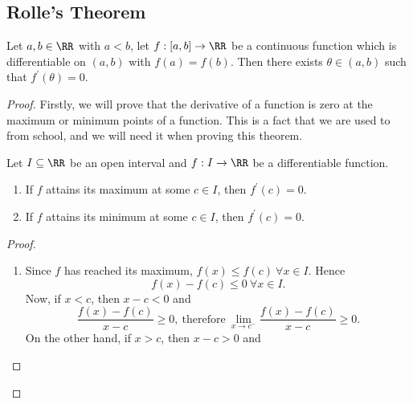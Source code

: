 \documentclass[../real_analysis.tex]{subfiles}
\begin{document}
        \subsection{Rolle's Theorem}\label{subsec:rolles-theorem}
            \begin{theorem}\label{thm:rolles-thm}
                Let $a,b\in\RR$ with $a<b$, let $f:[a,b]\to\RR$ be a continuous function which is differentiable on $(a,b)$ with $f(a)=f(b)$. Then there exists $\theta\in(a,b)$ such that $f^\prime(\theta)=0$.
            \end{theorem}
            \begin{proof}
                Firstly, we will prove that the derivative of a function is zero at the maximum or minimum points of a function. This is a fact that we are used to from school, and we will need it when proving this theorem.
                \begin{lemma}
                    Let $I\subseteq\RR$ be an open interval and $f:I\to\RR$ be a differentiable function.
                    \begin{enumerate}[label={\upshape(\roman*)}]
                        \item If $f$ attains its maximum at some $c\in I$, then $f^\prime(c)=0$.
                        \item If $f$ attains its minimum at some $c\in I$, then $f^\prime(c)=0$.
                    \end{enumerate}
                \end{lemma}
                \begin{proof}\\
                    \begin{enumerate}[label={\upshape(\roman*)}]
                        \item Since $f$ has reached its maximum, $f(x)\leq f(c)\ \forall x\in I$. Hence
                        \begin{equation}
                            f(x)-f(c)\leq 0\ \forall x\in I.
                        \end{equation}
                        Now, if $x<c$, then $x-c<0$ and
                        \begin{equation}
                            \frac{f(x)-f(c)}{x-c}\geq0,\ \text{therefore}\ \lim_{x\to c^-}\frac{f(x)-f(c)}{x-c}\geq0.
                        \end{equation}
                        On the other hand, if $x>c$, then $x-c>0$ and
                        \begin{equation}

\end{equation}
\end{enumerate}
\end{proof}
\end{proof}
\end{document}

